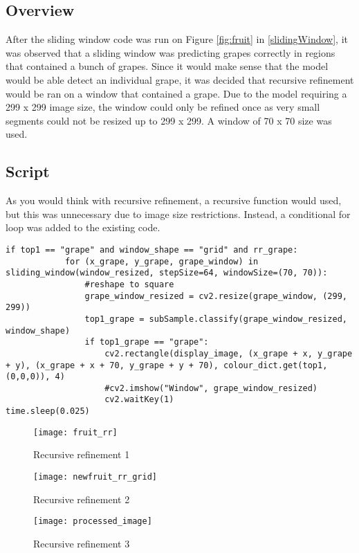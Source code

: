 \subsection*{Overview}
After the sliding window code was run on Figure \ref{fig:fruit} in \ref{slidingWindow},
it was observed that a sliding window was predicting grapes correctly in
regions that contained a bunch of grapes. Since it would make sense that the
model would be able detect an individual grape, it was decided that
recursive refinement would be ran on a window that contained a grape. Due to the model
requiring a 299 x 299 image size, the window could only be refined once as
very small segments could not be resized up to 299 x 299. A window of 70 x 70 size was used.

\subsection*{Script}
As you would think with recursive refinement, a recursive function would used,
but this was unnecessary due to image size restrictions. Instead, a
conditional for loop was added to the existing code.
\begin{lstlisting}[style=Python]
if top1 == "grape" and window_shape == "grid" and rr_grape:
			for (x_grape, y_grape, grape_window) in sliding_window(window_resized, stepSize=64, windowSize=(70, 70)):
				#reshape to square
				grape_window_resized = cv2.resize(grape_window, (299, 299))
				top1_grape = subSample.classify(grape_window_resized, window_shape)
				if top1_grape == "grape":
					cv2.rectangle(display_image, (x_grape + x, y_grape + y), (x_grape + x + 70, y_grape + y + 70), colour_dict.get(top1, (0,0,0)), 4)
					#cv2.imshow("Window", grape_window_resized)
					cv2.waitKey(1)
time.sleep(0.025)
\end{lstlisting}

\begin{figure}
    \texttt{[image: fruit\_rr]}
      \caption{Recursive refinement 1}
      \label{fig:rr1}
\end{figure}

\begin{figure}
    \texttt{[image: newfruit\_rr\_grid]}
      \caption{Recursive refinement 2}
      \label{fig:rr2}
\end{figure}

\begin{figure}
    \texttt{[image: processed\_image]}
      \caption{Recursive refinement 3}
      \label{fig:rr3}
\end{figure}


